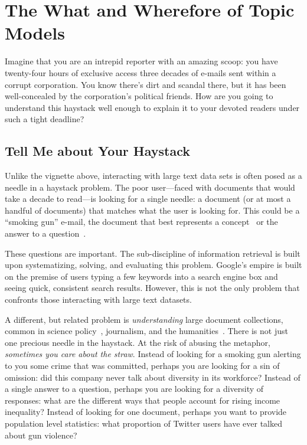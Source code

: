 
\chapter{The What and Wherefore of Topic Models}
\label{ch:intro}

Imagine that you are an intrepid reporter with an amazing scoop: you have
twenty-four hours of exclusive access three decades of e-mails sent within a
corrupt corporation.  You know there's dirt and scandal there, but it has been
well-concealed by the corporation's political friends.  How are you going to
understand this haystack well enough to explain it to your devoted readers under
such a tight deadline?

\section{Tell Me about Your Haystack}

Unlike the vignette above, interacting with large text data sets is often posed
as a needle in a haystack problem.  The poor user---faced with documents that
would take a decade to read---is looking for a single needle: a document (or at
most a handful of documents) that matches what the user is looking for.  This
could be a ``smoking gun'' e-mail, the document that best represents a
concept~\citep{Salton-68} or the answer to a question~\citep{Hirschman-01}.

These questions are important.  The sub-discipline of information retrieval is
built upon systematizing, solving, and evaluating this problem.  Google's empire
is built on the premise of users typing a few keywords into a search engine box
and seeing quick, consistent search results.  However, this is not the only
problem that confronts those interacting with large text datasets.

A different, but related problem is \emph{understanding} large document
collections, common in science policy~\citep{talley-11}, journalism, and the
humanities~\citep{moretti-13}.  There is not just one precious needle in
the haystack.  At the risk of abusing the metaphor, \emph{sometimes you care
  about the straw}.  Instead of looking for a smoking gun alerting to you some
crime that was committed, perhaps you are looking for a sin of
omission: did this company never talk about diversity in its workforce?
Instead of a single answer to a question, perhaps you are looking for a diversity
of responses: what are the different ways that people account for rising income
inequality?  Instead of looking for one document, perhaps you want to provide
population level statistics: what proportion of Twitter users have ever talked
about gun violence?

